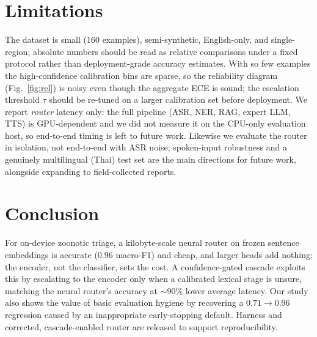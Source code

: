 \documentclass[runningheads]{llncs}
\begin{document}
\section{Limitations}\label{sec:lim}
The dataset is small (160 examples), semi-synthetic, English-only, and
single-region; absolute numbers should be read as relative comparisons under a
fixed protocol rather than deployment-grade accuracy estimates. With so few
examples the high-confidence calibration bins are sparse, so the reliability
diagram (Fig.~\ref{fig:rel}) is noisy even though the aggregate ECE is sound; the
escalation threshold $\tau$ should be re-tuned on a larger calibration set before
deployment. We report \emph{router} latency only: the full pipeline (ASR, NER,
RAG, expert LLM, TTS) is GPU-dependent and we did not measure it on the
CPU-only evaluation host, so end-to-end timing is left to future work. Likewise
we evaluate the router in isolation, not end-to-end with ASR noise; spoken-input
robustness and a genuinely multilingual (Thai) test set are the main directions
for future work, alongside expanding to field-collected reports.

\section{Conclusion}
For on-device zoonotic triage, a kilobyte-scale neural router on frozen sentence
embeddings is accurate ($0.96$ macro-F1) and cheap, and larger heads add nothing;
the encoder, not the classifier, sets the cost. A confidence-gated cascade
exploits this by escalating to the encoder only when a calibrated lexical stage
is unsure, matching the neural router's accuracy at $\sim$90\% lower average
latency. Our study also shows the value of basic evaluation hygiene by recovering
a $0.71\!\rightarrow\!0.96$ regression caused by an inappropriate early-stopping
default. Harness and corrected, cascade-enabled router are released to support
reproducibility.
\end{document}
